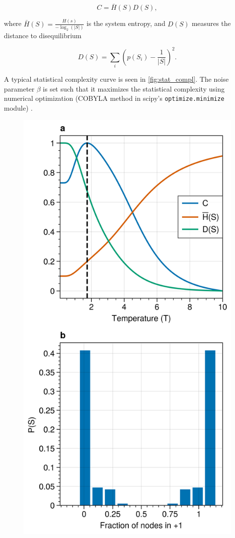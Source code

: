 \documentclass[a4paper, 11pt, twocolumn]{article}
\begin{document}
\[C = \bar H(S) D(S),\]

where \(\bar H(S) = \frac{H(s)}{-\log_2(|S|)}\) is the system entropy,
and \(D(S)\) measures the distance to disequilibrium

\[D(S) = \sum_i (p(S_i) - \frac{1}{|S|})^2.\]

A typical statistical complexity curve is seen in
\cref{fig:stat_compl}. The noise parameter \(\beta\) is set such that
it maximizes the statistical complexity using numerical optimization
(COBYLA method in scipy's \texttt{optimize.minimize} module)
\cite{Virtanen2020}.

\begin{figure}[htbp]
\centering
\includegraphics[width=.9\linewidth]{./figures/exact_kite_dyn=ising_beta=0.5732374683235916_T=200_statistical_complexity.png}

\end{figure}
\end{document}
